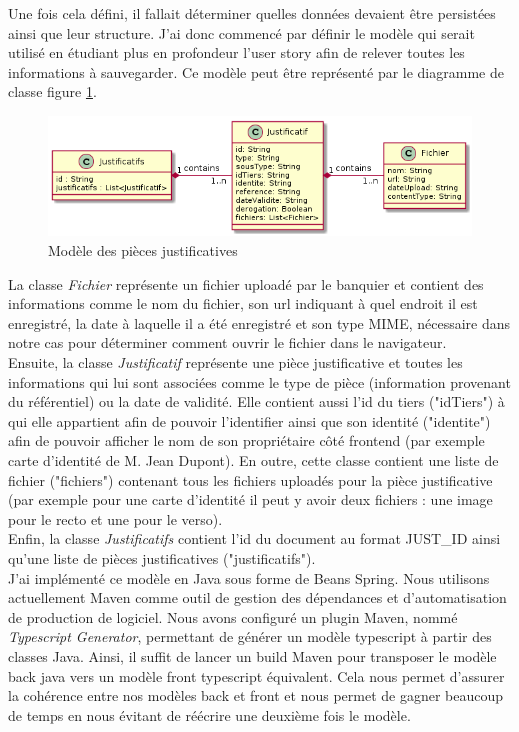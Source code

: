 	Une fois cela défini, il fallait déterminer quelles données devaient être persistées ainsi que leur structure. J'ai donc commencé par définir le modèle qui serait utilisé en étudiant plus en profondeur l'user story afin de relever toutes les informations à sauvegarder. Ce modèle peut être représenté par le diagramme de classe figure \ref{modelePJ}.	
	
\begin{figure}[h!]
	\includegraphics[scale=0.7]{images/travailBP1818/piecesJustif/modelePJ.png}
	\centering
	\caption{Modèle des pièces justificatives}
	\label{modelePJ}
\end{figure}

	La classe \textit{Fichier} représente un fichier uploadé par le banquier et contient des informations comme le nom du fichier, son url indiquant à quel endroit il est enregistré, la date à laquelle il a été enregistré et son type MIME, nécessaire dans notre cas pour déterminer comment ouvrir le fichier dans le navigateur. \\
	
	Ensuite, la classe \textit{Justificatif} représente une pièce justificative et toutes les informations qui lui sont associées comme le type de pièce (information provenant du référentiel) ou la date de validité. Elle contient aussi l'id du tiers ("idTiers") à qui elle appartient afin de pouvoir l'identifier ainsi que son identité ("identite") afin de pouvoir afficher le nom de son propriétaire côté frontend (par exemple carte d'identité de M. Jean Dupont). En outre, cette classe contient une liste de fichier ("fichiers") contenant tous les fichiers uploadés pour la pièce justificative (par exemple pour une carte d'identité il peut y avoir deux fichiers : une image pour le recto et une pour le verso). \\
	
	Enfin, la classe \textit{Justificatifs} contient l'id du document au format JUST\_ID ainsi qu'une liste de pièces justificatives ("justificatifs"). \\
	
	J'ai implémenté ce modèle en Java sous forme de Beans Spring. Nous utilisons actuellement Maven comme outil de gestion des dépendances et d'automatisation de production de logiciel. Nous avons configuré un plugin Maven, nommé \textit{Typescript Generator}, permettant de générer un modèle typescript à partir des classes Java. Ainsi, il suffit de lancer un build Maven pour transposer le modèle back java vers un modèle front typescript équivalent. Cela nous permet d'assurer la cohérence entre nos modèles back et front et nous permet de gagner beaucoup de temps en nous évitant de réécrire une deuxième fois le modèle.
	  
